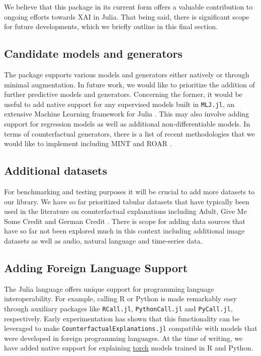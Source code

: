 \documentclass{juliacon}
\begin{document}
We believe that this package in its current form offers a valuable
contribution to ongoing efforts towards XAI in Julia. That being said,
there is significant scope for future developments, which we briefly
outline in this final section.

\hypertarget{candidate-models-and-generators}{%
\subsection{Candidate models and
generators}\label{candidate-models-and-generators}}

The package supports various models and generators either natively or
through minimal augmentation. In future work, we would like to
prioritize the addition of further predictive models and generators.
Concerning the former, it would be useful to add native support for any
supervised models built in \texttt{MLJ.jl}, an extensive Machine
Learning framework for Julia \cite{blaom2020mlj}. This may also involve
adding support for regression models as well as additional
non-differentiable models. In terms of counterfactual generators, there
is a list of recent methodologies that we would like to implement
including MINT \cite{karimi2021algorithmic} and ROAR
\cite{upadhyay2021robust}.

\hypertarget{additional-datasets}{%
\subsection{Additional datasets}\label{additional-datasets}}

For benchmarking and testing purposes it will be crucial to add more
datasets to our library. We have so far prioritized tabular datasets
that have typically been used in the literature on counterfactual
explanations including Adult, Give Me Some Credit and German Credit
\cite{karimi2020survey}. There is scope for adding data sources that
have so far not been explored much in this context including additional
image datasets as well as audio, natural language and time-series data.

\hypertarget{sec-dis-foreign}{%
\subsection{Adding Foreign Language Support}\label{sec-dis-foreign}}

The Julia language offers unique support for programming language
interoperability. For example, calling R or Python is made remarkably
easy through auxiliary packages like \texttt{RCall.jl},
\texttt{PythonCall.jl} and \texttt{PyCall.jl}, respectively. Early
experimentation has shown that this functionality can be leveraged to
make \texttt{CounterfactualExplanations.jl} compatible with models that
were developed in foreign programming languages. At the time of writing,
we have added native support for explaining
\href{https://pytorch.org/}{torch} models trained in R and Python.
\end{document}
